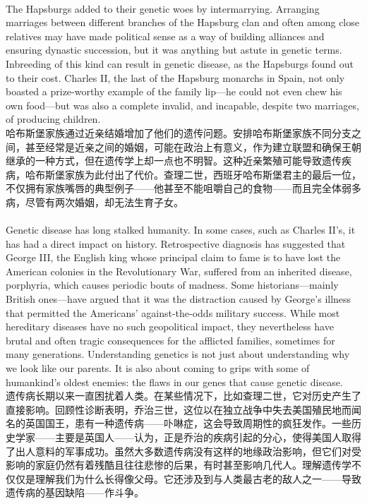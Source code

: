 \documentclass{article}
\begin{document}
\\
The Hapsburgs added to their genetic woes by intermarrying. Arranging marriages between different branches of the Hapsburg clan and often among close relatives may have made political sense as a way of building alliances and ensuring dynastic succession, but it was anything but astute in genetic terms. Inbreeding of this kind can result in genetic disease, as the Hapsburgs found out to their cost. Charles II, the last of the Hapsburg monarchs in Spain, not only boasted a prize-worthy example of the family lip—he could not even chew his own food—but was also a complete invalid, and incapable, despite two marriages, of producing children.\\
哈布斯堡家族通过近亲结婚增加了他们的遗传问题。安排哈布斯堡家族不同分支之间，甚至经常是近亲之间的婚姻，可能在政治上有意义，作为建立联盟和确保王朝继承的一种方式，但在遗传学上却一点也不明智。这种近亲繁殖可能导致遗传疾病，哈布斯堡家族为此付出了代价。查理二世，西班牙哈布斯堡君主的最后一位，不仅拥有家族嘴唇的典型例子——他甚至不能咀嚼自己的食物——而且完全体弱多病，尽管有两次婚姻，却无法生育子女。\\

\\
Genetic disease has long stalked humanity. In some cases, such as Charles II’s, it has had a direct impact on history. Retrospective diagnosis has suggested that George III, the English king whose principal claim to fame is to have lost the American colonies in the Revolutionary War, suffered from an inherited disease, porphyria, which causes periodic bouts of madness. Some historians—mainly British ones—have argued that it was the distraction caused by George’s illness that permitted the Americans’ against-the-odds military success. While most hereditary diseases have no such geopolitical impact, they nevertheless have brutal and often tragic consequences for the afflicted families, sometimes for many generations. Understanding genetics is not just about understanding why we look like our parents. It is also about coming to grips with some of humankind’s oldest enemies: the flaws in our genes that cause genetic disease.\\
遗传病长期以来一直困扰着人类。在某些情况下，比如查理二世，它对历史产生了直接影响。回顾性诊断表明，乔治三世，这位以在独立战争中失去美国殖民地而闻名的英国国王，患有一种遗传病——卟啉症，这会导致周期性的疯狂发作。一些历史学家——主要是英国人——认为，正是乔治的疾病引起的分心，使得美国人取得了出人意料的军事成功。虽然大多数遗传病没有这样的地缘政治影响，但它们对受影响的家庭仍然有着残酷且往往悲惨的后果，有时甚至影响几代人。理解遗传学不仅仅是理解我们为什么长得像父母。它还涉及到与人类最古老的敌人之一——导致遗传病的基因缺陷——作斗争。\\
\end{document}
